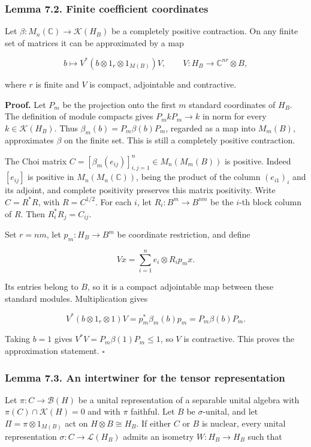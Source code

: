 \documentclass[
  11pt,
]{article}
\begin{document}
\subsubsection{Lemma 7.2. Finite coefficient
coordinates}\label{lemma-7.2.-finite-coefficient-coordinates}

Let \(\beta:M_n(\mathbb C)\to\mathcal K(H_B)\) be a completely positive
contraction. On any finite set of matrices it can be approximated by a
map

\[
b\longmapsto V^*(b\otimes1_r\otimes1_{M(B)})V,
\qquad V:H_B\longrightarrow\mathbb C^{nr}\otimes B,
\]

where \(r\) is finite and \(V\) is compact, adjointable and contractive.

\textbf{Proof.} Let \(P_m\) be the projection onto the first \(m\)
standard coordinates of \(H_B\). The definition of module compacts gives
\(P_m kP_m\to k\) in norm for every \(k\in\mathcal K(H_B)\). Thus
\(\beta_m(b)=P_m\beta(b)P_m\), regarded as a map into \(M_m(B)\),
approximates \(\beta\) on the finite set. This is still a completely
positive contraction.

The Choi matrix \(C=[\beta_m(e_{ij})]_{i,j=1}^n\in M_n(M_m(B))\) is
positive. Indeed \([e_{ij}]\) is positive in \(M_n(M_n(\mathbb C))\),
being the product of the column \((e_{i1})_i\) and its adjoint, and
complete positivity preserves this matrix positivity. Write \(C=R^*R\),
with \(R=C^{1/2}\). For each \(i\), let \(R_i:B^m\to B^{nm}\) be the
\(i\)-th block column of \(R\). Then \(R_i^*R_j=C_{ij}\).

Set \(r=nm\), let \(p_m:H_B\to B^m\) be coordinate restriction, and
define

\[
Vx=\sum_{i=1}^ne_i\otimes R_ip_mx.
\]

Its entries belong to \(B\), so it is a compact adjointable map between
these standard modules. Multiplication gives

\[
V^*(b\otimes1_r\otimes1)V
=p_m^*\beta_m(b)p_m=P_m\beta(b)P_m.
\]

Taking \(b=1\) gives \(V^*V=P_m\beta(1)P_m\leq1\), so \(V\) is
contractive. This proves the approximation statement. \(\square\)

\subsubsection{Lemma 7.3. An intertwiner for the tensor
representation}\label{lemma-7.3.-an-intertwiner-for-the-tensor-representation}

Let \(\pi:C\to\mathcal B(H)\) be a unital representation of a separable
unital algebra with \(\pi(C)\cap\mathcal K(H)=0\) and with \(\pi\)
faithful. Let \(B\) be \(\sigma\)-unital, and let
\(\Pi=\pi\otimes1_{M(B)}\) act on \(H\otimes B\cong H_B\). If either
\(C\) or \(B\) is nuclear, every unital representation
\(\sigma:C\to\mathcal L(H_B)\) admits an isometry \(W:H_B\to H_B\) such
that
\end{document}
